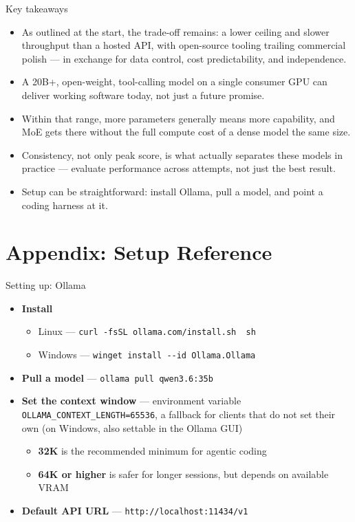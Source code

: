 \documentclass[aspectratio=169,10pt]{beamer}
\begin{document}
\begin{frame}{Key takeaways}
  \begin{itemize}
    \item As outlined at the start, the trade-off remains: a lower ceiling
      and slower throughput than a hosted API, with open-source tooling
      trailing commercial polish --- in exchange for data control, cost
      predictability, and independence.
    \item A 20B+, open-weight, tool-calling model on a single consumer GPU
      can deliver working software today, not just a future promise.
    \item Within that range, more parameters generally means more
      capability, and MoE gets there without the full compute cost of a
      dense model the same size.
    \item Consistency, not only peak score, is what actually separates
      these models in practice --- evaluate performance across attempts,
      not just the best result.
    \item Setup can be straightforward: install Ollama, pull a model, and
      point a coding harness at it.
  \end{itemize}
\end{frame}

\appendix
\section{Appendix: Setup Reference}

\begin{frame}{Setting up: Ollama}
  \begin{itemize}
    \item \textbf{Install}
      \begin{itemize}
        \item Linux --- \texttt{curl -fsSL ollama.com/install.sh \textbar\ sh}
        \item Windows --- \texttt{winget install -{}-id Ollama.Ollama}
      \end{itemize}
    \item \textbf{Pull a model} --- \texttt{ollama pull qwen3.6:35b}
    \item \textbf{Set the context window} --- environment variable
      \texttt{OLLAMA\_CONTEXT\_LENGTH=65536}, a fallback for clients that do
      not set their own (on Windows, also settable in the Ollama GUI)
      \begin{itemize}
        \item \textbf{32K} is the recommended minimum for agentic coding
        \item \textbf{64K or higher} is safer for longer sessions, but
          depends on available VRAM
      \end{itemize}
    \item \textbf{Default API URL} --- \texttt{http://localhost:11434/v1}
  \end{itemize}
\end{frame}
\end{document}
